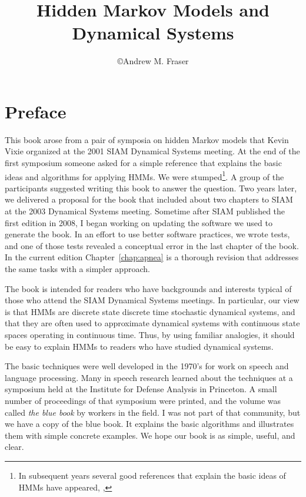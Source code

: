 \documentclass[ltxbook,showlabels, commentsvisible]{hmmdsbook}
\author{\copyright Andrew M. Fraser}
\title{Hidden Markov Models and Dynamical Systems}
\begin{document}
\frontmatter
\maketitle

\chapter*{Preface}
\label{chap:preface}
This book arose from a pair of symposia on hidden Markov models that
Kevin Vixie organized at the 2001 SIAM Dynamical Systems meeting.  At
the end of the first symposium someone asked for a simple reference
that explains the basic ideas and algorithms for applying HMMs.  We
were stumped\footnote{In subsequent years several good references that
  explain the basic ideas of HMMs have appeared, \eg, }.  A
group of the participants suggested writing this book to answer the
question.  Two years later, we delivered a proposal for the book that
included about two chapters to SIAM at the 2003 Dynamical Systems
meeting.  Sometime after SIAM published the first edition in 2008, I
began working on updating the software we used to generate the book.
In an effort to use better software practices, we wrote tests, and one
of those tests revealed a conceptual error in the last chapter of the
book.  In the current edition Chapter~\ref{chap:apnea} is a thorough
revision that addresses the same tasks with a simpler approach.

The book is intended for readers who have backgrounds and interests
typical of those who attend the SIAM Dynamical Systems meetings.  In
particular, our view is that HMMs are discrete state discrete time
stochastic dynamical systems, and that they are often used to
approximate dynamical systems with continuous state spaces operating
in continuous time.  Thus, by using familiar analogies, it should be
easy to explain HMMs to readers who have studied dynamical systems.

The basic techniques were well developed in the 1970's for work on
speech and language processing.  Many in speech research learned about
the techniques at a symposium held at the Institute for Defense
Analysis  in Princeton.  A small
number of proceedings of that symposium \cite{ida80} were printed, and
the volume was called \emph{the blue book} by workers in the field.  I
was not part of that community, but we have a copy of the blue book.
It explains the basic algorithms and illustrates them with simple
concrete examples.  We hope our book is as simple, useful, and clear.
\end{document}
